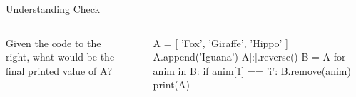 \documentclass[pdf, aspectratio=169, 12pt]{beamer}
\begin{document}
\begin{frame}[fragile]{Understanding Check}
	\begin{columns}
		Given the code to the right, what would be the final printed value of A?
		\begin{poll}
		\item {}
		\item {}
		\item {}
		\item {}
		\end{poll}
		
		\begin{pythoncode}
			A = [
				'Fox',
				'Giraffe', 
				'Hippo'
				]
			A.append('Iguana')
			A[:].reverse()
			B = A
			for anim in B:
				if anim[1] == 'i':
					B.remove(anim)
			print(A)
		\end{pythoncode}
	\end{columns}
\end{frame}
\end{document}
